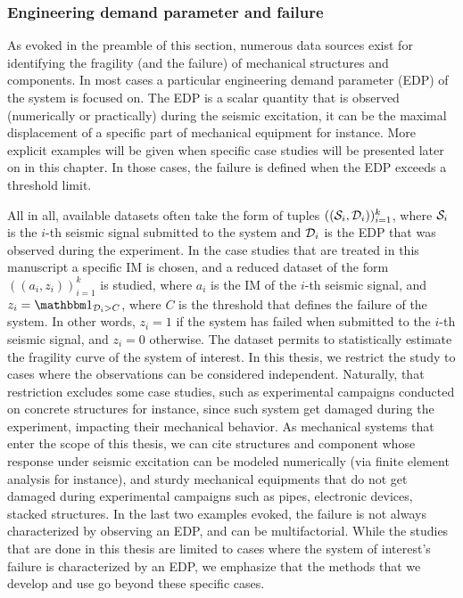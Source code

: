 

\subsubsection{Engineering demand parameter and failure}


As evoked in the preamble of this section, numerous data sources exist for identifying the fragility (and the failure) of mechanical structures and components.
In most cases a particular engineering demand parameter (EDP) of the system is focused on. The EDP is a scalar quantity that is observed (numerically or practically) during the seismic excitation, it can be the maximal displacement of a specific part of mechanical equipment for instance. More explicit examples will be given when specific case studies will be presented later on in this chapter. 
In those cases, the failure is defined when the EDP exceeds a threshold limit.

All in all, available datasets often take the form of tuples $((\mathcal{S}_i,\mathcal{D}_i))_{i=1}^k$, where $\mathcal{S}_i$ is the $i$-th seismic signal submitted to the system and $\mathcal{D}_i$ is the EDP that was observed during the experiment. %
%
In the case studies that are treated in this manuscript a specific IM is chosen, and a reduced dataset of the form $((a_i,z_i))_{i=1}^k$ is studied, where $a_i$ is the IM of the $i$-th seismic signal, and $z_i=\indic_{\cD_i> C }$, where $ C $ is the threshold that defines the failure of the system. In other words, $z_i=1$ if the system has failed when submitted to the  $i$-th seismic signal, and $z_i=0$ otherwise.
The dataset permits to statistically estimate the fragility curve of the system of interest. In this thesis, we restrict the study to cases where the observations can be considered independent. Naturally, that restriction excludes some case studies, such as experimental campaigns conducted on concrete structures for instance, since such system get damaged during the experiment, impacting their mechanical behavior. 
As mechanical systems that enter the scope of this thesis, we can cite
    structures and component  whose response under seismic excitation can be modeled numerically (via finite element analysis for instance), and
    sturdy mechanical equipments that do not get damaged during experimental campaigns such as pipes, electronic devices, stacked structures.
In the last two examples evoked, the failure is not always characterized by observing an EDP, and can be multifactorial. While the studies that are done in this thesis are limited to cases where the system of interest's failure is characterized by an EDP, we emphasize that the methods that we develop and use go beyond these specific cases.



